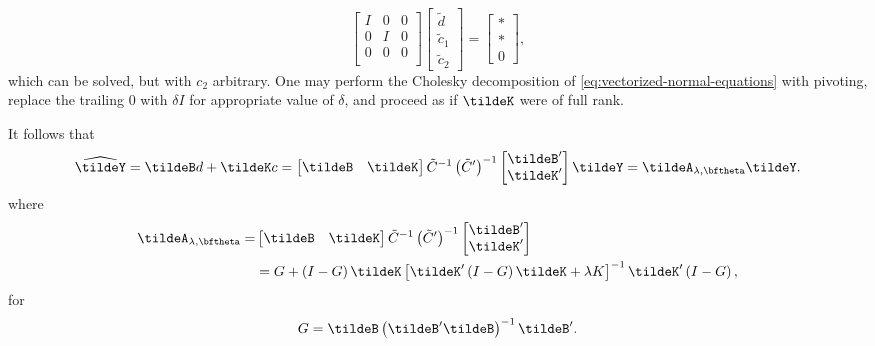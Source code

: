 \begin{equation} \label{eq:vectorized-normal-equations-cholesky-2}
\begin{bmatrix}
I & 0 & 0\\
0 & I & 0 \\
0 & 0 & 0 \\
\end{bmatrix}
\begin{bmatrix}
\tilde{d}\\
\tilde{c}_1\\
\tilde{c}_2
\end{bmatrix}
= \begin{bmatrix}
* \\
* \\
0
\end{bmatrix},
\end{equation}
\noindent
which can be solved, but with $c_2$ arbitrary. One may perform the Cholesky decomposition of \ref{eq:vectorized-normal-equations} with pivoting, replace the trailing $0$ with $\delta I$ for appropriate value of $\delta$, and proceed as if $\tildeK$ were of full rank. 

\bigskip

It follows that
\begin{equation} \label{eq:tildeY-hat-equals-tildeA-tildeY}
\widehat{\tildeY} = \tildeB d + \tildeK c = \begin{bmatrix} \tildeB & \tildeK \end{bmatrix} \tilde{C}^{-1} \left(\tilde{C}'\right)^{-1} \begin{bmatrix} \tildeB' \\ \tildeK' \end{bmatrix} \tildeY = \tildeA_{\lambda,\bftheta} \tildeY.
\end{equation} 
\noindent
where
\begin{align}
\begin{split} \label{eq:smoothing-matrix-A-tilde}
\tildeA_{\lambda,\bftheta} =& \begin{bmatrix} \tildeB & \tildeK \end{bmatrix} \tilde{C}^{-1} \left(\tilde{C}'\right)^{-1} \begin{bmatrix} \tildeB' \\ \tildeK' \end{bmatrix}  \\
&= G + \left(I - G\right) \tildeK \left[\tildeK'\left( I - G \right)\tildeK + \lambda K\right]^{-1} \tildeK'\left(I - G\right),
\end{split}
\end{align} 
\noindent
for
\[
G = \tildeB\left(\tildeB' \tildeB \right)^{-1}\tildeB'.
\]



